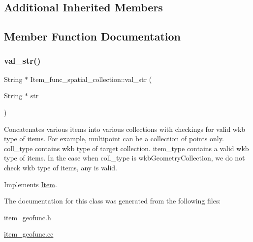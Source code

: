\subsection*{Additional Inherited Members}


\subsection{Member Function Documentation}
\mbox{\label{classItem__func__spatial__collection_a3eab68a38b40a1b60fc3ed4646f0465b}} 
\subsubsection{\texorpdfstring{val\+\_\+str()}{val\_str()}}
{\footnotesize\ttfamily String $\ast$ Item\+\_\+func\+\_\+spatial\+\_\+collection\+::val\+\_\+str (\begin{DoxyParamCaption}\item[{String $\ast$}]{str }\end{DoxyParamCaption})\hspace{0.3cm}{\ttfamily [virtual]}}

Concatenates various items into various collections with checkings for valid wkb type of items. For example, multipoint can be a collection of points only. coll\+\_\+type contains wkb type of target collection. item\+\_\+type contains a valid wkb type of items. In the case when coll\+\_\+type is wkb\+Geometry\+Collection, we do not check wkb type of items, any is valid. 

Implements \mbox{\hyperlink{classItem}{Item}}.



The documentation for this class was generated from the following files\+:\begin{DoxyCompactItemize}
\item 
item\+\_\+geofunc.\+h\item 
\mbox{\hyperlink{item__geofunc_8cc}{item\+\_\+geofunc.\+cc}}\end{DoxyCompactItemize}

